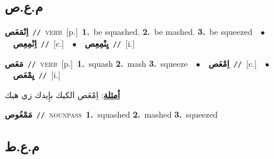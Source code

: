 \documentclass[10pt,a4paper,twoside]{article} %
\begin{document}
\begin{multicols}{2}
\vspace{-3mm}
\subsection*{\color{blue}\foreignlanguage{arabic}{م.ع.ص}\color{blue}{}} 

{\setlength\topsep{0pt}\textbf{\foreignlanguage{arabic}{اِنْمَعَص}}\ {\color{gray}\texttt{//}\color{black}}\ \textsc{verb}\ [p.]\ \textbf{1.}~be squashed.  \textbf{2.}~be mashed.  \textbf{3.}~be squeezed\ \ $\bullet$\ \ \setlength\topsep{0pt}\textbf{\foreignlanguage{arabic}{اِنْمِعِص}}\ {\color{gray}\texttt{//}\color{black}}\ [c.]\ \ $\bullet$\ \ \setlength\topsep{0pt}\textbf{\foreignlanguage{arabic}{يِنْمِعِص}}\ {\color{gray}\texttt{//}\color{black}}\ [i.]\ } \vspace{2mm}

{\setlength\topsep{0pt}\textbf{\foreignlanguage{arabic}{مَعَص}}\ {\color{gray}\texttt{//}\color{black}}\ \textsc{verb}\ [p.]\ \textbf{1.}~squash  \textbf{2.}~mash  \textbf{3.}~squeeze\ \ $\bullet$\ \ \setlength\topsep{0pt}\textbf{\foreignlanguage{arabic}{اِمْعَص}}\ {\color{gray}\texttt{//}\color{black}}\ [c.]\ \ $\bullet$\ \ \setlength\topsep{0pt}\textbf{\foreignlanguage{arabic}{يِمْعَص}}\ {\color{gray}\texttt{//}\color{black}}\ [i.]\  \begin{flushright}\color{gray}\foreignlanguage{arabic}{\textbf{\underline{\foreignlanguage{arabic}{أمثلة}}}: اِمْعَص الكيك بإِيدك زي هيك}\end{flushright}\color{black}} \vspace{2mm}

{\setlength\topsep{0pt}\textbf{\foreignlanguage{arabic}{مَمْعُوص}}\ {\color{gray}\texttt{//}\color{black}}\ \textsc{noun\textunderscore pass}\ \textbf{1.}~squashed  \textbf{2.}~mashed  \textbf{3.}~squeezed\ } \vspace{2mm}

\vspace{-3mm}
\subsection*{\color{blue}\foreignlanguage{arabic}{م.ع.ط}\color{blue}{}} 


\end{multicols}
\end{document}
